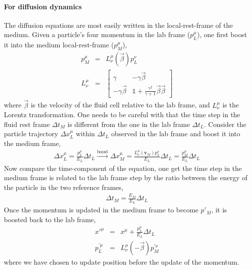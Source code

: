 \paragraph{For diffusion dynamics} The diffusion equations are most easily  written in the local-rest-frame of the medium.
Given a particle's four momentum in the lab frame ($p_{L}^\mu$), one first boost it into the medium local-rest-frame ($p_{M}^\mu$),
\begin{eqnarray}
p_{M}^\mu &=& L^\mu_\nu(\vec{\beta}) p_{L}^\nu\\
L^\mu_\nu &=& 
\begin{bmatrix}
\gamma & -\gamma\vec{\beta}\\
-\gamma\vec{\beta} & \mathbb{1} + \frac{\gamma^2}{\gamma+1}\vec{\beta}\vec{\beta}
\end{bmatrix}
\end{eqnarray}
where $\vec{\beta}$ is the velocity of the fluid cell relative to the lab frame, and $L^\mu_\nu$ is the Lorentz transformation.
One needs to be careful with that the time step in the fluid rest frame $\Delta t_{M}$ is different from the one in the lab frame $\Delta t_{L}$.
Consider the particle trajectory $\Delta x_{L}^\mu$ within $\Delta t_{L}$ observed in the lab frame and boost it into the medium frame,
\begin{eqnarray}
\Delta x_{L}^\mu = \frac{p_{L}^\mu}{E_L} \Delta t_{L} \xrightarrow{\textrm{boost}} \Delta x_{M}^\mu = \frac{L^\mu_\nu(\mathbf{v}_{M}) p_{L}^\nu}{E_L} \Delta t_L = \frac{p_{M}^\mu}{E_L} \Delta t_L
\end{eqnarray}
Now compare the time-component of the equation, one get the time step in the medium frame is related to the lab frame step by the ratio between the energy of the particle in the two reference frames,
\begin{eqnarray}
\Delta t_M = \frac{E_M}{E_L} \Delta t_L
\end{eqnarray}
Once the momentum is updated in the medium frame to become $p'_M$, it is boosted back to the lab frame,
\begin{eqnarray}
x'^{\mu} &=& x^{\mu} + \frac{p_{L}^\mu}{E_L} \Delta t_{L} \\
p_{L}^{'\mu} &=& L^\mu_\nu(-\vec{\beta}) p_{M}^{'\nu}
\end{eqnarray}
where we have chosen to update position before the update of the momentum.

